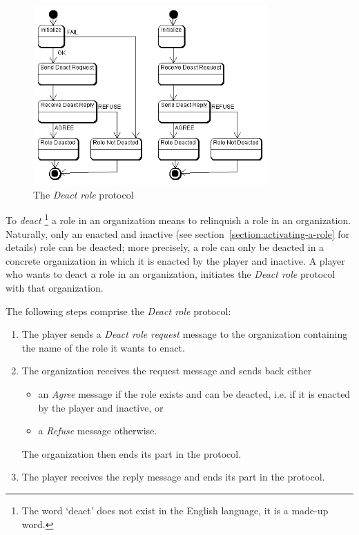 \begin{figure}[ht]
	\centering
	\includegraphics[width=0.8\textwidth]{images/thespian/deact-role-protocol.png}
	\caption{The \textit{Deact role} protocol}
	\label{figure:thespian-deact-role-protocol}
\end{figure}

To \textit{deact}
\footnote{The word `deact' does not exist in the English language, it is a made-up word.}
a role in an organization means to relinquish a role in an organization.
Naturally, only an enacted and inactive (see section~\ref{section:activating-a-role} for details) role can be deacted; more precisely, a role can only be deacted in a concrete organization in which it is enacted by the player and inactive.
A player who wants to deact a role in an organization, initiates the \textit{Deact role} protocol with that organization.

The following steps comprise the \textit{Deact role} protocol:
\begin{enumerate}
	\item The player sends a \textit{Deact role request} message to the organization containing the name of the role it wants to enact.
	\item The organization receives the request message and sends back either
	\begin{itemize}
		\item an \textit{Agree} message if the role exists and can be deacted, i.e. if it is enacted by the player and inactive, or
		\item a \textit{Refuse} message otherwise. 
	\end{itemize}
	The organization then ends its part in the protocol.
	\item The player receives the reply message and ends its part in the protocol.
\end{enumerate}

